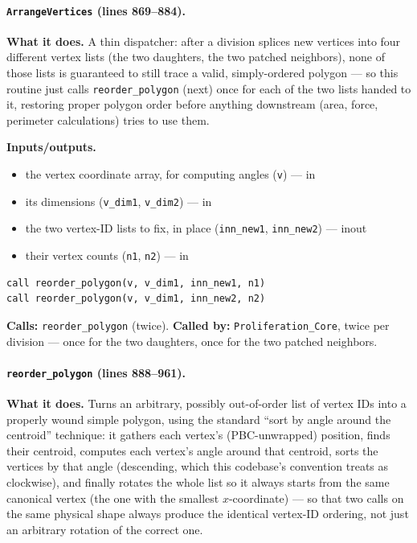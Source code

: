 \documentclass[11pt]{article}
\begin{document}
\paragraph{\texttt{ArrangeVertices} (lines 869--884).}
\textbf{What it does.} A thin dispatcher: after a division splices new vertices into
four different vertex lists (the two daughters, the two patched neighbors), none of
those lists is guaranteed to still trace a valid, simply-ordered polygon --- so this
routine just calls \texttt{reorder\_polygon} (next) once for each of the two lists
handed to it, restoring proper polygon order before anything downstream (area, force,
perimeter calculations) tries to use them.

\textbf{Inputs/outputs.}
\begin{itemize}[nosep]
  \item the vertex coordinate array, for computing angles (\texttt{v}) --- in
  \item its dimensions (\texttt{v\_dim1}, \texttt{v\_dim2}) --- in
  \item the two vertex-ID lists to fix, in place (\texttt{inn\_new1}, \texttt{inn\_new2}) --- inout
  \item their vertex counts (\texttt{n1}, \texttt{n2}) --- in
\end{itemize}

\begin{lstlisting}[caption={The complete body of \texttt{ArrangeVertices}.}]
call reorder_polygon(v, v_dim1, inn_new1, n1)
call reorder_polygon(v, v_dim1, inn_new2, n2)
\end{lstlisting}

\textbf{Calls:} \texttt{reorder\_polygon} (twice). \textbf{Called by:}
\texttt{Proliferation\_Core}, twice per division --- once for the two daughters, once
for the two patched neighbors.

\paragraph{\texttt{reorder\_polygon} (lines 888--961).}
\textbf{What it does.} Turns an arbitrary, possibly out-of-order list of vertex IDs
into a properly wound simple polygon, using the standard ``sort by angle around the
centroid'' technique: it gathers each vertex's (PBC-unwrapped) position, finds their
centroid, computes each vertex's angle around that centroid, sorts the vertices by
that angle (descending, which this codebase's convention treats as clockwise), and
finally rotates the whole list so it always starts from the same canonical vertex (the
one with the smallest $x$-coordinate) --- so that two calls on the same physical shape
always produce the identical vertex-ID ordering, not just an arbitrary rotation of the
correct one.
\end{document}
